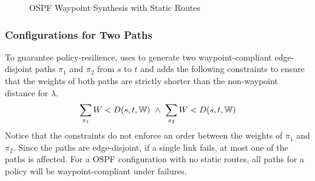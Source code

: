 \begin{figure}[t]
	\begin{minipage}{\columnwidth}
		\begin{algorithm}[H]
			\begin{footnotesize} 
				\caption{OSPF Waypoint Synthesis with Static Routes}
				\label{alg:wayptunsat}
				\begin{algorithmic}[1]
					\EndWhile
					\EndProcedure
				\end{algorithmic}
			\end{footnotesize}
		\end{algorithm}
	\end{minipage}
\end{figure}

\subsubsection{Configurations for Two Paths} \label{sec:ospfresilience} \hspace*{4mm}


To guarantee policy-resilience, \name
uses \genesis to generate two waypoint-compliant 
edge-disjoint paths $\pi_1$ and $\pi_2$ from $s$ to $t$
and
adds the following constraints
 to ensure that the  weights 
of both paths are strictly shorter than 
the non-waypoint distance for $\lambda$. 
\begin{equation} \label{eq:resilience}
\sum_{\pi_1}W < D(s,t,\mathbb{W}) ~\wedge~ \sum_{\pi_2}W < D(s,t,\mathbb{W}) 
\end{equation}
Notice that the constraints do not enforce an order between the weights of $\pi_1$ and $\pi_2$.
Since the paths are edge-disjoint, if a single link fails, at most one 
of the paths is affected.  
For a OSPF configuration with no static routes,
all paths for a policy will be waypoint-compliant under failures.

